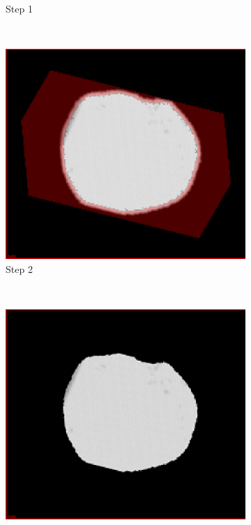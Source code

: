\begin{figure}[h]
\begin{subfigure}[b]{0.3\textwidth}
    \caption{Step 1}
    \label{fig:erosion1}
  \end{subfigure}  
  ~ %
  \begin{subfigure}[b]{0.3\textwidth}
    \includegraphics[width=\textwidth]{images/erosion/erosion_2.png}
    \caption{Step 2}
    \label{fig:erosion2}
  \end{subfigure}
  ~ %
  \begin{subfigure}[b]{0.3\textwidth}
    \includegraphics[width=\textwidth]{images/erosion/erosion_3.png}

\end{subfigure}
\end{figure}

